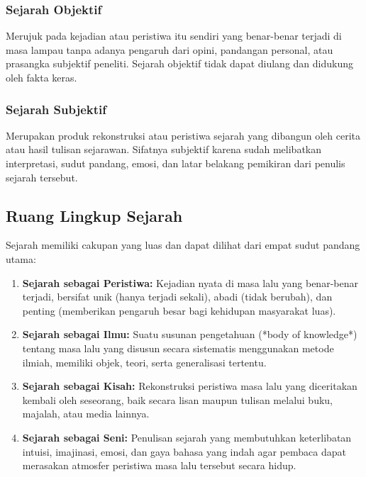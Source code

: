 \documentclass[12pt, a4paper]{article}
\begin{document}
\subsubsection{Sejarah Objektif}
Merujuk pada kejadian atau peristiwa itu sendiri yang benar-benar terjadi di masa lampau tanpa adanya pengaruh dari opini, pandangan personal, atau prasangka subjektif peneliti. Sejarah objektif tidak dapat diulang dan didukung oleh fakta keras.

\subsubsection{Sejarah Subjektif}
Merupakan produk rekonstruksi atau peristiwa sejarah yang dibangun oleh cerita atau hasil tulisan sejarawan. Sifatnya subjektif karena sudah melibatkan interpretasi, sudut pandang, emosi, dan latar belakang pemikiran dari penulis sejarah tersebut.

\subsection{Ruang Lingkup Sejarah}
Sejarah memiliki cakupan yang luas dan dapat dilihat dari empat sudut pandang utama:
\begin{enumerate}
	\item \textbf{Sejarah sebagai Peristiwa:} Kejadian nyata di masa lalu yang benar-benar terjadi, bersifat unik (hanya terjadi sekali), abadi (tidak berubah), dan penting (memberikan pengaruh besar bagi kehidupan masyarakat luas).
	\item \textbf{Sejarah sebagai Ilmu:} Suatu susunan pengetahuan (*body of knowledge*) tentang masa lalu yang disusun secara sistematis menggunakan metode ilmiah, memiliki objek, teori, serta generalisasi tertentu.
	\item \textbf{Sejarah sebagai Kisah:} Rekonstruksi peristiwa masa lalu yang diceritakan kembali oleh seseorang, baik secara lisan maupun tulisan melalui buku, majalah, atau media lainnya.
	\item \textbf{Sejarah sebagai Seni:} Penulisan sejarah yang membutuhkan keterlibatan intuisi, imajinasi, emosi, dan gaya bahasa yang indah agar pembaca dapat merasakan atmosfer peristiwa masa lalu tersebut secara hidup.
\end{enumerate}
\end{document}
